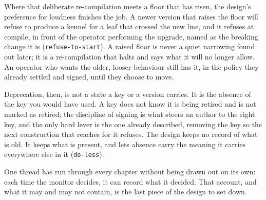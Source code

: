 Where that deliberate re-compilation meets a floor that has risen, the
design's preference for loudness finishes the job. A newer version that
raises the floor will refuse to produce a kennel for a leaf that crossed
the new line, and it refuses at compile, in front of the operator
performing the upgrade, named as the breaking change it is
(\texttt{refuse-to-start}). A raised floor is never a quiet narrowing
found out later; it is a re-compilation that halts and says what it will
no longer allow. An operator who wants the older, looser behaviour still
has it, in the policy they already settled and signed, until they choose
to move.

Deprecation, then, is not a state a key or a version carries. It is the
absence of the key you would have used. A key does not know it is being
retired and is not marked as retired; the discipline of signing is what
steers an author to the right key, and the only hard lever is the one
already described, removing the key so the next construction that
reaches for it refuses. The design keeps no record of what is old. It
keeps what is present, and lets absence carry the meaning it carries
everywhere else in it (\texttt{do-less}).

One thread has run through every chapter without being drawn out on its
own: each time the monitor decides, it can record what it decided. That
account, and what it may and may not contain, is the last piece of the
design to set down.
